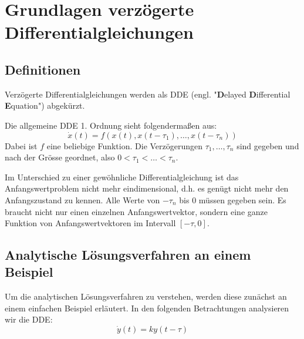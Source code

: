 %
%
%
\section{Grundlagen verzögerte Differentialgleichungen}
\subsection{Definitionen}
Verzögerte Differentialgleichungen werden als DDE (engl. "\textbf{D}elayed \textbf{D}ifferential \textbf{E}quation") abgekürzt.

Die allgemeine DDE 1. Ordnung sieht folgendermaßen aus:
\begin{equation}
	\dot{x}(t) = f(x(t),x(t-\tau_1),\dots,x(t-\tau_n))
\end{equation}
Dabei ist $f$ eine beliebige Funktion. Die Verzögerungen $\tau_1,\dots,\tau_n$ sind gegeben und nach der Grösse geordnet, also $0<\tau_1<\dots<\tau_n$.

Im Unterschied zu einer gewöhnliche Differentialgleichung ist das Anfangswertproblem nicht mehr eindimensional, d.h. es genügt nicht mehr den Anfangszustand zu kennen.
Alle Werte von $-\tau_n$ bis $0$ müssen gegeben sein. 
Es braucht nicht nur einen einzelnen Anfangswertvektor, sondern eine ganze Funktion von Anfangswertvektoren im Intervall $[-\tau, 0]$.

\subsection{Analytische Lösungsverfahren an einem Beispiel}
Um die analytischen Lösungsverfahren zu verstehen, werden diese zunächst an einem einfachen Beispiel erläutert.
In den folgenden Betrachtungen analysieren wir die DDE:
\begin{equation}\label{bsp}
\dot{y}(t)=ky(t-\tau)
\end{equation}

